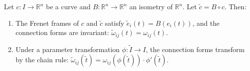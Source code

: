 Let $c: I \rightarrow \mathbb{R}^n$ be a curve and $B: \mathbb{R}^n \rightarrow \mathbb{R}^n$ an isometry of $\mathbb{R}^n$. Let $\tilde{c} = B \circ c$. Then:
\begin{enumerate}
\item[(i)] The Frenet frames of $c$ and $\tilde{c}$ satisfy $\tilde{e}_i(t) = B(e_i(t))$, and the connection forms are invariant: $\tilde{\omega}_{ij}(t) = \omega_{ij}(t)$.
\item[(ii)] Under a parameter transformation $\phi: \tilde{I} \rightarrow I$, the connection forms transform by the chain rule: $\tilde{\omega}_{ij}(\tilde{t}) = \omega_{ij}(\phi(\tilde{t})) \cdot \phi'(\tilde{t})$.
\end{enumerate}
